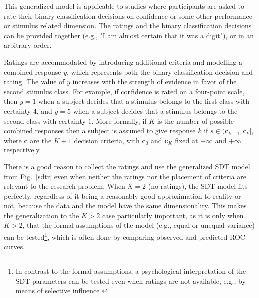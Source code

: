 \documentclass[oneside,a4paper]{article}
\begin{document}
This
generalized model is applicable to studies where participants are
asked to rate their binary classification decisions on confidence or
some other performance or stimulus related
dimension. The ratings and the binary classification decisions can be
provided together (e.g., "I am almost certain that it was a digit"),
or in an arbitrary order.


Ratings are accommodated by introducing additional criteria and
modelling a combined response $y$, which
represents both the binary classification decision and rating. The
value of $y$ increases with the strength of evidence in favor of the
second stimulus class. For example, if confidence is rated on a
four-point scale, then $y = 1$ when a subject decides
that a stimulus belongs to the first class with certainty $4$, and
$y = 5$ when a subject decides that a stimulus belongs to the second
class with certainty $1$. More formally, if $K$ is the number of
possible combined responses then a subject is assumed to give response
$k$ if $s \in (\bm{c}_{k-1},\bm{c}_k]$, where $\bm{c}$ are the $K+1$
decision criteria, with $\bm{c}_0$ and $\bm{c}_K$ fixed at $-\infty$
and $+\infty$ respectively.


There is a good reason to collect the ratings and use the generalized
SDT model from Fig.~\ref{sdtr} even when neither the ratings nor the
placement of criteria are relevant to the research problem.
When $K = 2$ (no ratings), the SDT model fits perfectly, regardless of
it being a reasonably good approximation to reality or not, because
the data and the model have the same dimensionality. This makes the
generalization to the $K > 2$ case particularly important, as it is
only when $K > 2$, that the formal assumptions of the model (e.g.,
equal or unequal variance) can be tested\footnote{In contrast to the
  formal assumptions, a psychological interpretation of the SDT
  parameters can be tested even when ratings are not available, e.g.,
  by means of selective influence \cite{sternberg2001separate}}, which
is often done by comparing observed and predicted ROC curves.
\end{document}
